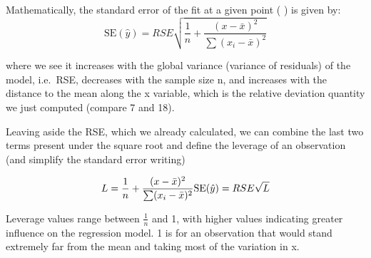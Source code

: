\documentclass[
  letterpaper,
  DIV=11,
  numbers=noendperiod]{scrreprt}
\newenvironment{Shaded}{\begin{snugshade}}{\end{snugshade}}
\newcommand{\CommentTok}[1]{\textcolor[rgb]{0.37,0.37,0.37}{#1}}
\newcommand{\DecValTok}[1]{\textcolor[rgb]{0.68,0.00,0.00}{#1}}
\newcommand{\FunctionTok}[1]{\textcolor[rgb]{0.28,0.35,0.67}{#1}}
\newcommand{\NormalTok}[1]{\textcolor[rgb]{0.00,0.23,0.31}{#1}}
\newcommand{\OtherTok}[1]{\textcolor[rgb]{0.00,0.23,0.31}{#1}}
\newcommand{\SpecialCharTok}[1]{\textcolor[rgb]{0.37,0.37,0.37}{#1}}
\begin{document}
\begin{Shaded}
\end{Shaded}

Mathematically, the standard error of the fit at a given point ( 
) is given by: \[
   \text{SE}(\hat{y}) = RSE\sqrt{\frac{1}{n} + \frac{(x - \bar{x})^2}{\sum (x_i - \bar{x})^2}}
   \]

where we see it increases with the global variance (variance of
residuals) of the model, i.e.~RSE, decreases with the sample size n, and
increases with the distance to the mean along the x variable, which is
the relative deviation quantity we just computed (compare 7 and 18).

Leaving aside the RSE, which we already calculated, we can combine the
last two terms present under the square root and define the leverage of
an observation (and simplify the standard error writing)

\[L=\frac{1}{n} + \frac{(x - \bar{x})^2}{\sum (x_i - \bar{x})^2}\\
\text{SE}(\hat{y}) = RSE\sqrt{L}\]

Leverage values range between \(\frac{1}{n}\) and 1, with higher values
indicating greater influence on the regression model. 1 is for an
observation that would stand extremely far from the mean and taking most
of the variation in x.
\end{document}
